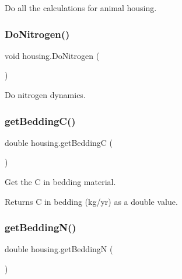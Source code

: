 Do all the calculations for animal housing. 

\mbox{\label{classhousing_a50306a2782cf072bc5b353331f001cf9}} 
\subsubsection{\texorpdfstring{DoNitrogen()}{DoNitrogen()}}
{\footnotesize\ttfamily void housing.\+Do\+Nitrogen (\begin{DoxyParamCaption}{ }\end{DoxyParamCaption})\hspace{0.3cm}{\ttfamily [inline]}}



Do nitrogen dynamics. 

\mbox{\label{classhousing_a75970a10d0af75df797cd4bb98c8c058}} 
\subsubsection{\texorpdfstring{getBeddingC()}{getBeddingC()}}
{\footnotesize\ttfamily double housing.\+get\+BeddingC (\begin{DoxyParamCaption}{ }\end{DoxyParamCaption})\hspace{0.3cm}{\ttfamily [inline]}}



Get the C in bedding material. 

\begin{DoxyReturn}{Returns}
C in bedding (kg/yr) as a double value. 
\end{DoxyReturn}
\mbox{\label{classhousing_af185cbf595b9482b20e13e12e0c82e64}} 
\subsubsection{\texorpdfstring{getBeddingN()}{getBeddingN()}}
{\footnotesize\ttfamily double housing.\+get\+BeddingN (\begin{DoxyParamCaption}{ }\end{DoxyParamCaption})\hspace{0.3cm}{\ttfamily [inline]}}



